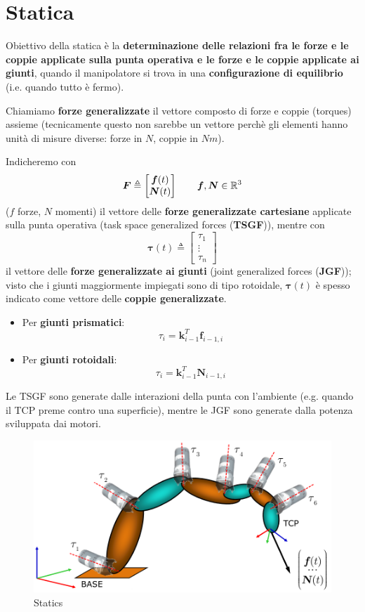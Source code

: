\chapter{Statica}

Obiettivo della statica è la \textbf{determinazione delle relazioni fra le forze e le coppie applicate sulla punta operativa e le forze e le coppie applicate ai giunti}, quando il manipolatore si trova in una \textbf{configurazione di equilibrio} (i.e. quando tutto è fermo).

Chiamiamo \textbf{forze generalizzate} il vettore composto di forze e coppie (torques) assieme (tecnicamente questo non sarebbe un vettore perchè gli elementi hanno unità di misure diverse: forze in $N$, coppie in $Nm$).

Indicheremo con
$$
\bm{F}
\triangleq
\begin{bmatrix*}
\bm{f}(t) \\
\bm{N}(t)
\end{bmatrix*}
\qquad
\bm{f},\bm{N} \in \R^3
$$
($f$ forze, $N$ momenti) il vettore delle \textbf{forze generalizzate cartesiane} applicate sulla punta operativa (task space generalized forces (\textbf{TSGF})), mentre con
$$
\bm{\tau}(t)
\triangleq
\begin{bmatrix*}
	\tau_1 \\
	\vdots \\
	\tau_n
\end{bmatrix*}
$$
il vettore delle \textbf{forze generalizzate ai giunti} (joint generalized forces (\textbf{JGF})); visto che i giunti maggiormente impiegati sono di tipo rotoidale, $\bm{\tau}(t)$ è spesso indicato come vettore delle \textbf{coppie generalizzate}.

\begin{itemize}
	\item Per \textbf{giunti prismatici}: 
	$$
	\tau_i = \bm{k}^T_{i-1} \bm{f}_{i-1,i}
	$$
	\item Per \textbf{giunti rotoidali}: 
	$$
	\tau_i = \bm{k}^T_{i-1} \bm{N}_{i-1,i}
	$$
\end{itemize}


Le TSGF sono generate dalle interazioni della punta con l'ambiente (e.g. quando il TCP preme contro una superficie), mentre le JGF sono generate dalla potenza sviluppata dai motori.

\begin{figure}[H]
	\centering
	\includegraphics[width=0.7\linewidth]{images/statics_1}
	\caption{Statics}
	\label{fig:statics1}
\end{figure}

